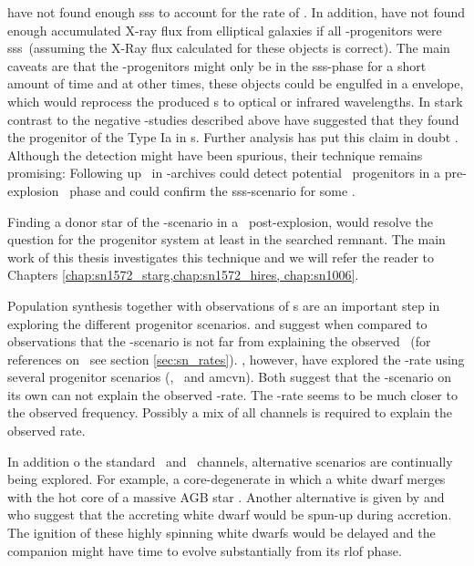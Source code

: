 \cite{2010ApJ...719..474D} have not found enough \gls{sss} to account for the rate of \sneia. In addition, \cite{2010Natur.463..924G} have not found enough accumulated X-ray flux from elliptical galaxies if all \snia-progenitors were \gls{sss}\ (assuming the X-Ray flux calculated for these objects is correct). The main caveats are that the \snia-progenitors might only be in the \gls{sss}-phase for a short amount of time and at other times, these objects could be engulfed in a envelope, which would reprocess the produced \xray s to optical or infrared wavelengths. In stark contrast to the negative \xray-studies described above \citet{2008Natur.451..802V} have suggested that they found the progenitor of the Type Ia  in \xray s. Further analysis has put this claim in doubt \citep{2008MNRAS.391..290R}. Although the detection might have been spurious, their technique remains promising: Following up \sneia\ in \xray-archives could detect potential \sneia\ progenitors in a pre-explosion \xray\ phase and could confirm the \gls{sss}-scenario for some \sneia.

Finding a donor star of the \sd-scenario in a \snr\ post-explosion, would resolve the question for the progenitor system at least in the searched remnant. The main work of this thesis investigates this technique and we will refer the reader to Chapters \ref{chap:sn1572_starg,chap:sn1572_hires, chap:sn1006}. 

Population synthesis together with observations of \dtd s are an important step in exploring the different progenitor scenarios. \citet{2008ApJ...683L.127H, Han:2004p444}  and suggest when compared to observations that the \sd-scenario is not far from explaining the observed \dtd\ (for references on \dtd\ see section \ref{sec:sn_rates}). \citet{2009ApJ...699.2026R, 2010A&A...515A..89M}, however, have explored the \snia-rate using several progenitor scenarios (\sd, \dd\ and \gls{amcvn}). Both suggest that the \sd-scenario on its own can not explain the observed \sneia-rate. The \dd-rate seems to be much closer to the observed frequency. Possibly a mix of all channels is required to explain the observed rate. 


In addition  o the standard \sd\ and \dd\ channels, alternative scenarios are continually being explored. For example, a core-degenerate  in which a white dwarf merges with the hot core of a massive AGB star \citep{2011arXiv1106.2027I}. Another alternative is given by \citet{2011arXiv1102.4342D} and \citet{2011ApJ...730L..34J} who suggest that the accreting white dwarf would be spun-up during accretion. The ignition of these highly spinning white dwarfs would be delayed and the companion might have time to evolve  substantially from its \gls{rlof} phase. 

